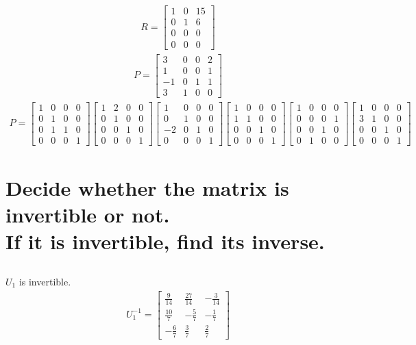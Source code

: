 \documentclass[a4paper, 12pt]{article}
\newcommand{\sub}[1]{\subsection{\underline{#1}}}
\newcommand{\eq}[1]{\begin{align*}#1\end{align*}}
\begin{document}
\setcounter{section}{4}
\setcounter{subsection}{2}
\sub{}
\eq{
    R=\begin{bmatrix}
        1&0&15\\
        0&1&6\\
        0&0&0\\
        0&0&0
    \end{bmatrix}
}
\eq{
    P=\begin{bmatrix}
        3&0&0&2\\
        1&0&0&1\\
        -1&0&1&1\\
        3&1&0&0
    \end{bmatrix}
}
\eq{
    P=
    \begin{bmatrix}
        1&0&0&0\\
        0&1&0&0\\
        0&1&1&0\\
        0&0&0&1
    \end{bmatrix}
    \begin{bmatrix}
        1&2&0&0\\
        0&1&0&0\\
        0&0&1&0\\
        0&0&0&1
    \end{bmatrix}
    \begin{bmatrix}
        1&0&0&0\\
        0&1&0&0\\
        -2&0&1&0\\
        0&0&0&1
    \end{bmatrix}
    \begin{bmatrix}
        1&0&0&0\\
        1&1&0&0\\
        0&0&1&0\\
        0&0&0&1
    \end{bmatrix}
    \begin{bmatrix}
        1&0&0&0\\
        0&0&0&1\\
        0&0&1&0\\
        0&1&0&0
    \end{bmatrix}
    \begin{bmatrix}
        1&0&0&0\\
        3&1&0&0\\
        0&0&1&0\\
        0&0&0&1
    \end{bmatrix}
}

\section{Decide whether the matrix is invertible or not.\\If it is invertible, find its inverse.}
\sub{}
$U_1$ is invertible.
\eq{
    U_1^{-1}=\begin{bmatrix}
        \frac{9}{14}&\frac{27}{14}&-\frac{3}{14}\\
        \frac{10}{7}&-\frac{5}{7}&-\frac{1}{7}\\
        -\frac{6}{7}&\frac{3}{7}&\frac{2}{7}
    \end{bmatrix}
}

\end{document}
